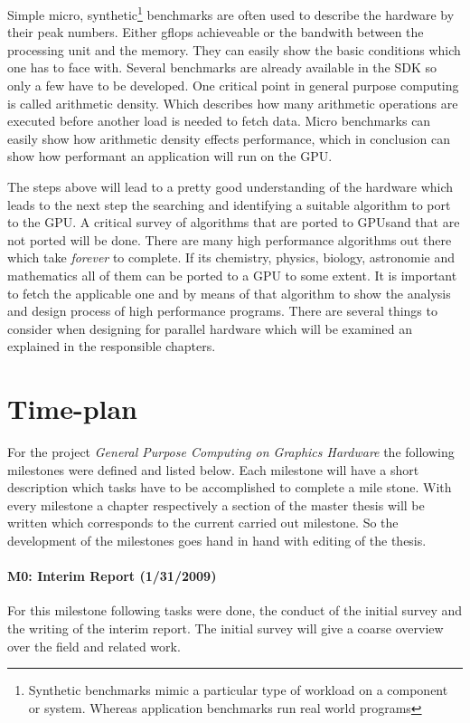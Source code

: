Simple micro, synthetic\footnote{Synthetic benchmarks mimic a particular type of
workload on a component or system. Whereas application benchmarks run real world
programs} benchmarks are often used to describe the hardware by their peak
numbers. Either gflops achieveable or the bandwith between the processing unit
and the memory. They can easily show the basic conditions which one has to face 
with. Several benchmarks are already available in the SDK so only a few have to 
be developed. One critical point in general purpose computing is called
arithmetic density. Which describes how many arithmetic operations are executed
before another load is needed to fetch data. Micro benchmarks can easily show 
how arithmetic density effects performance, which in conclusion can show how 
performant an application will run on the GPU. 

The steps above will lead to a pretty good understanding of the hardware which
leads to the next step the searching and identifying a suitable algorithm to
port to the GPU. A critical survey of algorithms that are ported to \glspl{GPU}and
that are not ported will be done. There are many high performance algorithms out
there which take \emph{forever} to complete. If its chemistry, physics, biology,
astronomie and mathematics all of them can be ported to a \gls{GPU} to some extent. It
is important to fetch the applicable one and by means of that algorithm to show
the analysis and design process of high performance programs. There are
several things to consider when designing for parallel hardware which will be
examined an explained in the responsible chapters.

\section*{Time-plan} 
\label{sub:time_plan} 
For the project \emph{General Purpose Computing on Graphics Hardware} the
following milestones were defined and listed below. Each milestone will have a
short description which tasks have to be accomplished to complete a mile stone.
With every milestone a chapter respectively a section of the master thesis will
be written which corresponds to the current carried out milestone. So the 
development of the milestones goes hand in hand with editing of the thesis.

\paragraph{M0: Interim Report (1/31/2009)} %
\label{par:interim_report}
For this milestone following tasks were done, the conduct of the initial survey 
and the writing of the interim report. The initial survey will give a coarse 
overview over the field and related work. 

